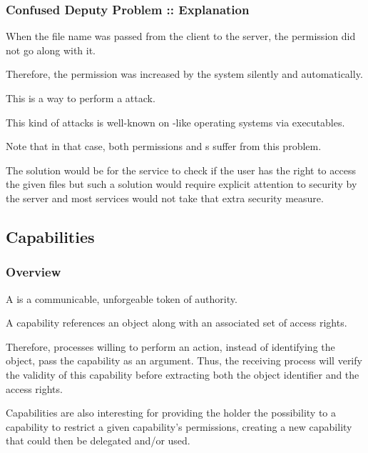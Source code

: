 
\begin{frame}
  \frametitle{Confused Deputy Problem :: Explanation}

  When the file name was passed from the client to the server, the permission
  did not go along with it.

  \-

  Therefore, the permission was increased by the system silently and
  automatically.

  \-

  This is a way to perform a  attack.

  \-

  This kind of attacks is well-known on -like operating systems
  via  executables.

  \-

  Note that in that case, both  permissions and s
  suffer from this problem.

  \-

  The solution would be for the service to check if the user has the right to
  access the given files but such a solution would require explicit attention
  to security by the server and most services would not take that extra
  security measure.
\end{frame}


\subsection{Capabilities}


\begin{frame}
  \frametitle{Overview}

  A  is a communicable, unforgeable token of authority.

  \-

  A capability references an object along with an associated set of access
  rights.

  \-

  Therefore, processes willing to perform an action, instead of identifying
  the object, pass the capability as an argument. Thus, the receiving process
  will verify the validity of this capability before extracting both
  the object identifier and the access rights.

  \-

  Capabilities are also interesting for providing the holder the possibility
  to  a capability \ie{} to restrict a given capability's
  permissions, creating a new capability that could then be delegated and/or
  used.
\end{frame}

